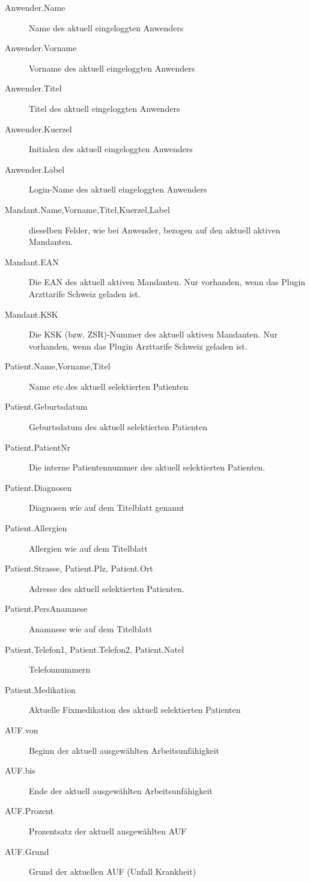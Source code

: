 \begin{description}
  \item [Anwender.Name] Name des aktuell eingeloggten Anwenders
  \item [Anwender.Vorname] Vorname des aktuell eingeloggten Anwenders
  \item [Anwender.Titel] Titel des aktuell eingeloggten Anwenders
  \item [Anwender.Kuerzel] Initialen des aktuell eingeloggten Anwenders
  \item [Anwender.Label] Login-Name des aktuell eingeloggten Anwenders
  \item [Mandant.Name,Vorname,Titel,Kuerzel,Label] dieselben Felder, wie bei Anwender, bezogen auf den aktuell
  aktiven Mandanten. 	
  \item [Mandant.EAN] Die EAN des aktuell aktiven Mandanten. Nur vorhanden, wenn
  das Plugin Arzttarife Schweiz geladen ist.
  \item [Mandant.KSK] Die KSK (bzw. ZSR)-Nummer des aktuell aktiven Mandanten.
  Nur vorhanden, wenn das Plugin Arzttarife Schweiz geladen ist.
  \item [Patient.Name,Vorname,Titel] Name etc.des aktuell selektierten Patienten
  \item [Patient.Geburtsdatum] Geburtsdatum des aktuell selektierten Patienten
  \item [Patient.PatientNr] Die interne Patientennummer des aktuell selektierten Patienten.
  \item [Patient.Diagnosen] Diagnosen wie auf dem Titelblatt genannt
  \item [Patient.Allergien] Allergien wie auf dem Titelblatt
  \item [Patient.Strasse, Patient.Plz, Patient.Ort] Adresse des aktuell
  selektierten Patienten.
  \item [Patient.PersAnamnese] Anamnese wie auf dem Titelblatt
  \item [Patient.Telefon1, Patient.Telefon2, Patient.Natel] Telefonnummern
  \item [Patient.Medikation] Aktuelle Fixmedikation des aktuell selektierten
  Patienten
  \item [AUF.von] Beginn der aktuell ausgewählten Arbeitsunfähigkeit
  \item [AUF.bis] Ende der aktuell ausgewählten Arbeitsunfähigkeit
  \item [AUF.Prozent] Prozentsatz der aktuell ausgewählten AUF
  \item [AUF.Grund] Grund der aktuellen AUF (Unfall Krankheit)

\end{description}
